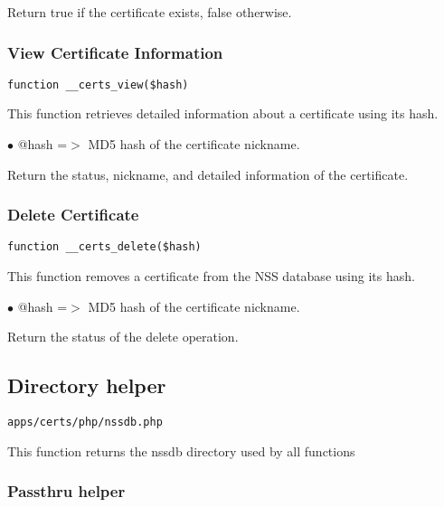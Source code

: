 \documentclass[a4paper]{article}
\begin{document}
Return true if the certificate exists, false otherwise.

\hypertarget{toc7}{}
\subsubsection{View Certificate Information}

\begin{lstlisting}
function __certs_view($hash)
\end{lstlisting}

This function retrieves detailed information about a certificate using its hash.

\begin{compactitem}
\item[\color{myblue}$\bullet$] @hash =$>$ MD5 hash of the certificate nickname.
\end{compactitem}

Return the status, nickname, and detailed information of the certificate.

\hypertarget{toc8}{}
\subsubsection{Delete Certificate}

\begin{lstlisting}
function __certs_delete($hash)
\end{lstlisting}

This function removes a certificate from the NSS database using its hash.

\begin{compactitem}
\item[\color{myblue}$\bullet$] @hash =$>$ MD5 hash of the certificate nickname.
\end{compactitem}

Return the status of the delete operation.

\hypertarget{toc9}{}
\subsection{Directory helper}

\begin{lstlisting}
apps/certs/php/nssdb.php
\end{lstlisting}

This function returns the nssdb directory used by all functions

\hypertarget{toc10}{}
\subsubsection{Passthru helper}
\end{document}

